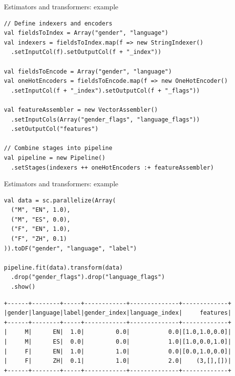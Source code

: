\documentclass[unicode, notheorems]{beamer}
\begin{document}
\begin{frame}[fragile]{Estimators and transformers: example}

{\footnotesize
\begin{verbatim}
// Define indexers and encoders
val fieldsToIndex = Array("gender", "language")
val indexers = fieldsToIndex.map(f => new StringIndexer()
  .setInputCol(f).setOutputCol(f + "_index"))

val fieldsToEncode = Array("gender", "language")
val oneHotEncoders = fieldsToEncode.map(f => new OneHotEncoder()
  .setInputCol(f + "_index").setOutputCol(f + "_flags"))

val featureAssembler = new VectorAssembler()
  .setInputCols(Array("gender_flags", "language_flags"))
  .setOutputCol("features")

// Combine stages into pipeline
val pipeline = new Pipeline()
  .setStages(indexers ++ oneHotEncoders :+ featureAssembler)
\end{verbatim}
}
\end{frame}

\begin{frame}[fragile]{Estimators and transformers: example}

{\footnotesize
\begin{verbatim}
val data = sc.parallelize(Array(
  ("M", "EN", 1.0),
  ("M", "ES", 0.0),
  ("F", "EN", 1.0),
  ("F", "ZH", 0.1)
)).toDF("gender", "language", "label")

pipeline.fit(data).transform(data)
  .drop("gender_flags").drop("language_flags")
  .show()
\end{verbatim}

\begin{verbatim}
+------+--------+-----+------------+--------------+-------------+
|gender|language|label|gender_index|language_index|     features|
+------+--------+-----+------------+--------------+-------------+
|     M|      EN|  1.0|         0.0|           0.0|[1.0,1.0,0.0]|
|     M|      ES|  0.0|         0.0|           1.0|[1.0,0.0,1.0]|
|     F|      EN|  1.0|         1.0|           0.0|[0.0,1.0,0.0]|
|     F|      ZH|  0.1|         1.0|           2.0|    (3,[],[])|
+------+--------+-----+------------+--------------+-------------+
\end{verbatim}
}
\end{frame}
\end{document}
